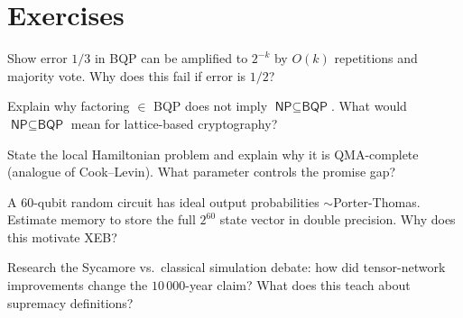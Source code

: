 \section{Exercises}
\begin{exercise}
Show error $1/3$ in BQP can be amplified to $2^{-k}$ by $O(k)$ repetitions and majority vote. Why does this fail if error is $1/2$?
\end{exercise}
\begin{exercise}
Explain why factoring $\in$ BQP does not imply $\textsf{NP}\subseteq\textsf{BQP}$. What would $\textsf{NP}\subseteq\textsf{BQP}$ mean for lattice-based cryptography?
\end{exercise}
\begin{exercise}
State the local Hamiltonian problem and explain why it is QMA-complete (analogue of Cook--Levin). What parameter controls the promise gap?
\end{exercise}
\begin{exercise}
A 60-qubit random circuit has ideal output probabilities $\sim$Porter-Thomas. Estimate memory to store the full $2^{60}$ state vector in double precision. Why does this motivate XEB?
\end{exercise}
\begin{exercise}
Research the Sycamore vs.\ classical simulation debate: how did tensor-network improvements change the $10\,000$-year claim? What does this teach about supremacy definitions?
\end{exercise}
